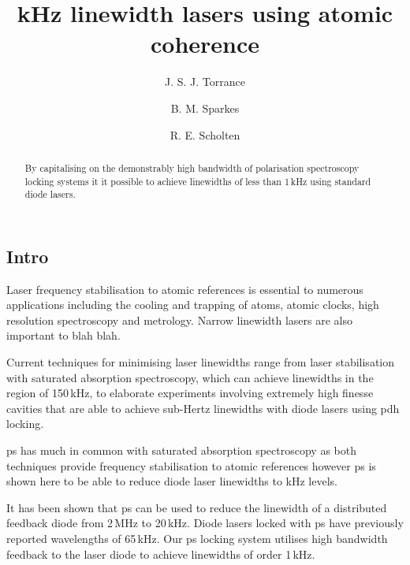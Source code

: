 \documentclass{article}
\begin{document}
\title{kHz linewidth lasers using atomic coherence}
\author[1]{J. S. J. Torrance}
\author[1]{B. M. Sparkes}
\author[1]{R. E. Scholten}


\maketitle

\begin{abstract}
By capitalising on the demonstrably high bandwidth of polarisation spectroscopy locking systems it it possible to achieve linewidths of less than 1\,kHz using standard diode lasers.
\end{abstract}

\begin{multicols}{2}

\section{Intro}
Laser frequency stabilisation to atomic references is essential to numerous applications including the cooling and trapping of atoms\cite{uetake_high_2008, ye_stable_2010, akamatsu_narrow_2012}, atomic clocks\cite{ludlow_sr_2008}, high resolution spectroscopy\cite{rafac_sub-dekahertz_2000} and metrology\cite{metcalf_laser_1999, ye_quantum_2008, demtroder_laser_2014}. Narrow linewidth lasers are also important to {\color{red}blah blah}.

Current techniques for minimising laser linewidths range from laser stabilisation with saturated absorption spectroscopy, which can achieve linewidths in the region of 150\,kHz\cite{cuneo_optically_1994}, to elaborate experiments involving extremely high finesse cavities that are able to achieve sub-Hertz linewidths with diode lasers using \gls{pdh} locking\cite{ludlow_compact_2007}.

\Gls{ps}\cite{wieman_doppler-free_1976, demtroder_laser_2014} has much in common with saturated absorption spectroscopy\cite{maguire_theoretical_2006, haroche_theory_1972, preston_doppler-free_1996} as both techniques provide frequency stabilisation to atomic references however \gls{ps} is shown here to be able to reduce diode laser linewidths to kHz levels.

It has been shown that \gls{ps} can be used to reduce the linewidth of a distributed feedback diode from 2\,MHz to 20\,kHz\cite{torii_laser-phase_2012}. Diode lasers locked with \gls{ps} have previously reported wavelengths of 65\,kHz\cite{yoshikawa_frequency_2003}. Our \gls{ps} locking system utilises high bandwidth feedback to the laser diode to achieve linewidths of order 1\,kHz.


\end{multicols}
\end{document}
